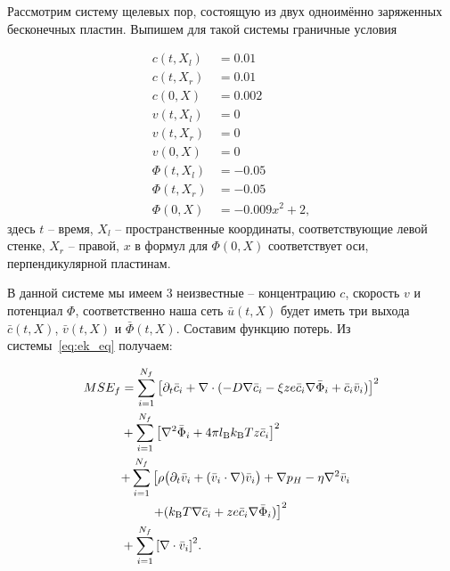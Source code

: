 \documentclass[a4paper,14pt]{extarticle} %
\begin{document}
Рассмотрим систему щелевых пор, состоящую из двух одноимённо заряженных бесконечных пластин. Выпишем для такой системы граничные условия

\begin{equation}\label{eq:ek_bnd}
    \begin{aligned}
        c(t, X_l)    & = 0.01         \\
        c(t, X_r)    & = 0.01         \\
        c(0, X)      & = 0.002        \\
        v(t, X_l)    & = 0            \\
        v(t, X_r)    & = 0            \\
        v(0, X)      & = 0            \\
        \Phi(t, X_l) & = -0.05        \\
        \Phi(t, X_r) & = -0.05        \\
        \Phi(0, X)   & = -0.009x^2+2,
    \end{aligned}
\end{equation}
здесь $t$ -- время, $X_l$ -- пространственные координаты, соответствующие левой стенке, $X_r$ -- правой, $x$ в формул для $\Phi(0,X)$ соответствует оси, перпендикулярной пластинам.

В данной системе мы имеем 3 неизвестные -- концентрацию $c$, скорость $v$ и потенциал $\Phi$, соответственно наша сеть $\bar{u}(t, X)$ будет иметь три выхода $\bar{c}(t, X)$, $\bar{v}(t, X)$ и $\bar{\Phi}(t, X)$. Составим функцию потерь. Из системы~\eqref{eq:ek_eq} получаем:

\begin{equation}\label{eq:ek_mse_eq}
    \begin{aligned}
        MSE_f & = \sum_{i=1}^{N_f}{\left[ \partial_{t} \bar{c}_i + \nabla\cdot(-D \nabla \bar{c}_i - \xi z e \bar{c}_i \nabla \bar{\Phi}_i + \bar{c}_i \bar{v}_i) \right]}^2                                                                                  \\
              & +\sum_{i=1}^{N_f}{\left[ \nabla^2 \bar{\Phi}_i + 4 \pi l_\mathrm{B} k_\mathrm{B}T z \bar{c}_i \right]}^2                                                                                                                                      \\
              & \begin{aligned}
                    +\sum_{i=1}^{N_f} & \left[\rho \big( \partial_t \bar{v}_i + (\bar{v}_i \cdot \nabla ) \bar{v}_i \big) + \nabla p_H - \eta \nabla^{2} \bar{v}_i\right. \\
                                      & \left. +(k_\mathrm{B}T \nabla \bar{c}_i + ze\bar{c}_i \nabla \bar{\Phi}_i)\right]^2
                \end{aligned} \\
              & +\sum_{i=1}^{N_f}{\left[ \nabla \cdot \bar{v}_i \right]}^2.
    \end{aligned}
\end{equation}
\end{document}
